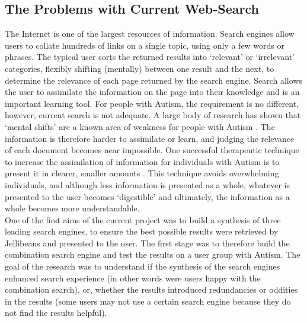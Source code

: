 \documentclass[a4paper, 11pt]{article}
\begin{document}
\subsection{The Problems with Current Web-Search}\label{What should search offer people with Autism}

The Internet is one of the largest resources of information. Search engines allow users to collate hundreds of links on a single topic, using only a few words or phrases. The typical user sorts the returned results into `relevant' or `irrelevant' categories, flexibly shifting (mentally) between one result and the next, to determine the relevance of each page returned by the search engine. Search allows the user to assimilate the information on the page into their knowledge and is an important learning tool. For people with Autism, the requirement is no different, however, current search is not adequate. A large body of research has shown that `mental shifts' are a known area of weakness for people with Autism \cite{disengagement}. The information is therefore harder to assimilate or learn, and judging the relevance of each document becomes near impossible. One successful therapeutic technique to increase the assimilation of information for individuals with Autism is to present it in clearer, smaller amounts \cite{AdultsWithAutism}. This technique avoids overwhelming individuals, and although less information is presented as a whole, whatever is presented to the user becomes `digestible' and ultimately, the information as a whole becomes more understandable.  \\
\vspace{5mm}
One of the first aims of the current project was to build a synthesis of three leading search engines, to ensure the best possible results were retrieved by Jellibeans and presented to the user. The first stage was to therefore build the combination search engine and test the results on a user group with Autism. The goal of the research was to understand if the synthesis of the search engines enhanced search experience (in other words were users happy with the combination search), or, whether the results introduced redundancies or oddities in the results (some users may not use a certain search engine because they do not find the results helpful).\\
\vspace{5mm}
\end{document}
